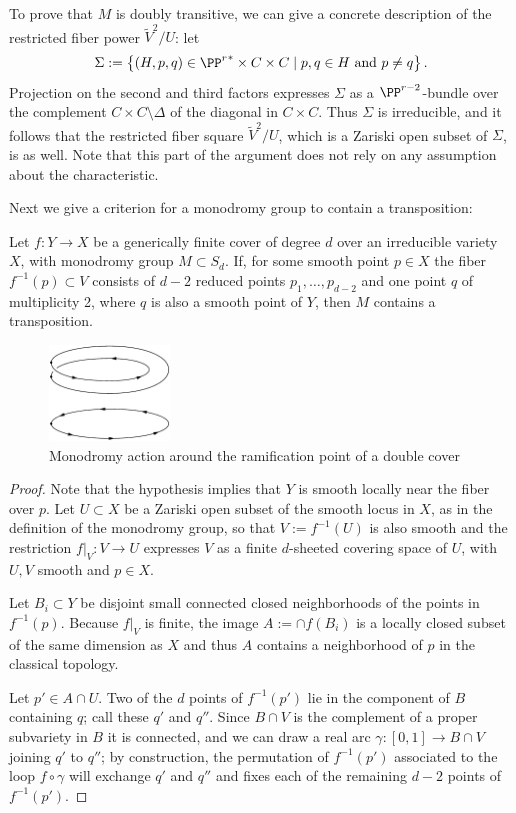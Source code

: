 To prove that $M$ is doubly transitive, we can give a concrete description of the restricted fiber power $\tilde V^2/U$: let
$$
\Sigma := \left\{ (H, p, q) \in {\PP^r}^* \times C \times C \mid p, q \in H \text{ and } p \neq q \right\}.
$$
Projection on the second and third factors expresses $\Sigma$ as a $\PP^{r-2}$-bundle over the complement $C \times C \setminus \Delta$ of the diagonal in $C \times C$. Thus $\Sigma$ is irreducible, and it follows that the restricted fiber square $\tilde V^2/U$, which is a Zariski open subset of $\Sigma$, is as well. Note that this part of the argument does not rely on any assumption about the characteristic.

Next we give a criterion for a monodromy group to contain a transposition:

\begin{lemma}\label{transposition lemma}
Let $f : Y \to X$ be a generically finite cover of degree $d$ over an irreducible variety $X$, with  monodromy group $M \subset S_d$.  
If,  for some smooth point $p \in X$ the fiber $f^{-1}(p)\subset V$ consists of $d-2$ reduced points $p_1,\dots, p_{d-2}$ and one point $q$ of multiplicity 2, where $q$ is also a smooth point of $Y$, then $M$ contains a transposition.
\end{lemma}

\begin{figure}
\centerline {\includegraphics[height=1in]{"main/Fig10-1"}}
\caption{Monodromy action around the ramification point of a double cover}
\label{default}
\end{figure}

\begin{proof} Note that the hypothesis implies that $Y$ is smooth
locally near the fiber over $p$. Let $U \subset X$ be a Zariski open subset of the smooth locus in $X$, as in the definition of the monodromy group, so that  $V := f^{-1}(U)$ is also smooth and the restriction $f|_V : V \to U$ expresses $V$ as a finite $d$-sheeted covering space of $U$, with $U,V$ smooth and $p\in X$.

Let $B_i\subset Y$ be disjoint small connected closed neighborhoods of the points
in $f^{-1}(p)$. Because $f|_V$  is finite, the image $A := \cap f(B_i)$  is a locally
closed subset of the same dimension as $X$ and thus $A$
 contains a neighborhood
of $p$ in the classical topology.

Let $p' \in A \cap U$. Two of the $d$ points of $f^{-1}(p')$  lie in the component  of $B$ containing $q$; call these $q'$ and $q''$. Since $B \cap V$ is the complement of a proper subvariety in $B$ it is connected, and we can draw a real arc $\gamma : [0,1] \to B \cap V$ joining $q'$ to $q''$; by construction, the permutation of $f^{-1}(p')$ associated to the loop $f \circ \gamma$ will exchange $q'$ and $q''$ and fixes each of the remaining $d-2$ points of $f^{-1}(p')$.
\end{proof}

